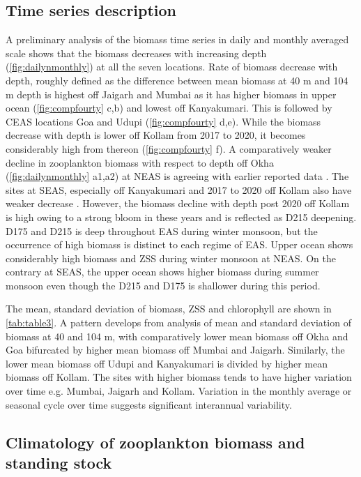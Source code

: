\documentclass{article}
\begin{document}
		\subsection{Time series description}
		\label{sec:timeseries}
		A preliminary analysis of the biomass time series in daily and monthly averaged scale shows that the biomass decreases with increasing depth (\cref{fig:dailynmonthly}) at all the seven locations. Rate of biomass decrease with depth, roughly defined as the difference between mean biomass at 40 m  and 104 m depth is highest off Jaigarh and Mumbai as it has higher biomass in upper ocean (\cref{fig:compfourty} c,b) and lowest off Kanyakumari. This is followed by CEAS locations Goa and Udupi (\cref{fig:compfourty} d,e). While the biomass decrease with depth is lower off Kollam from 2017 to 2020, it becomes considerably high from thereon (\cref{fig:compfourty} f). A comparatively weaker decline in zooplankton biomass with respect to depth off Okha (\cref{fig:dailynmonthly} a1,a2) at NEAS is agreeing with earlier reported data \citep{wishner1998mesozooplankton, madhupratap2001mesozooplankton, smith2005mesozooplankton,jyothibabu2010re}. The sites at SEAS, especially off Kanyakumari and 2017 to 2020 off Kollam also have weaker decrease \citep{madhupratap2001mesozooplankton, jyothibabu2010re, aparna2022seasonal}. However, the biomass decline with depth post 2020 off Kollam is high owing to a strong bloom in these years and is reflected as D215 deepening. D175 and D215 is deep throughout EAS during winter monsoon, but the occurrence of high biomass is distinct to each regime of EAS. Upper ocean shows considerably high biomass and ZSS during winter monsoon at NEAS. On the contrary at SEAS, the upper ocean shows higher biomass during summer monsoon even though the D215 and D175 is shallower during this period. 
		
		The mean, standard deviation of biomass, ZSS and chlorophyll are shown in \autoref{tab:table3}. A pattern develops from analysis of mean and standard deviation of biomass at 40 and 104 m, with comparatively lower mean biomass off Okha and Goa bifurcated by higher mean biomass off Mumbai and Jaigarh. Similarly, the lower mean biomass off Udupi and Kanyakumari is divided by higher mean biomass off Kollam. The sites with higher biomass tends to have higher variation over time e.g. Mumbai, Jaigarh and Kollam. Variation in the monthly average or seasonal cycle over time suggests significant interannual variability.
		
		\subsection{Climatology of zooplankton biomass and standing stock}
		\label{sec:climatology}
\end{document}
